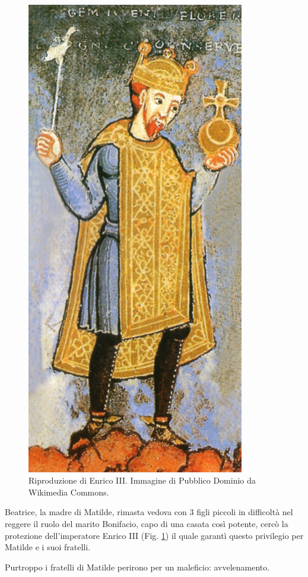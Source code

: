 \documentclass[letterpaper,twocolumn,openany,nodeprecatedcode]{dndbook}
\begin{document}
\begin{figure}
\centering
\includegraphics[width=9.5cm]{./img/enrico3.png}
\caption{Riproduzione di Enrico III. Immagine di Pubblico Dominio da Wikimedia Commons.}
\label{enrico3}
\end{figure}


Beatrice, la madre di Matilde, rimasta vedova con 3 figli piccoli in difficoltà nel reggere il ruolo del marito Bonifacio, capo di una casata così potente, cercò la protezione dell'imperatore Enrico III (Fig. \ref{enrico3}) il quale garantì questo privilegio per Matilde e i suoi fratelli.

Purtroppo i fratelli di Matilde perirono per un maleficio: avvelenamento.
\end{document}
